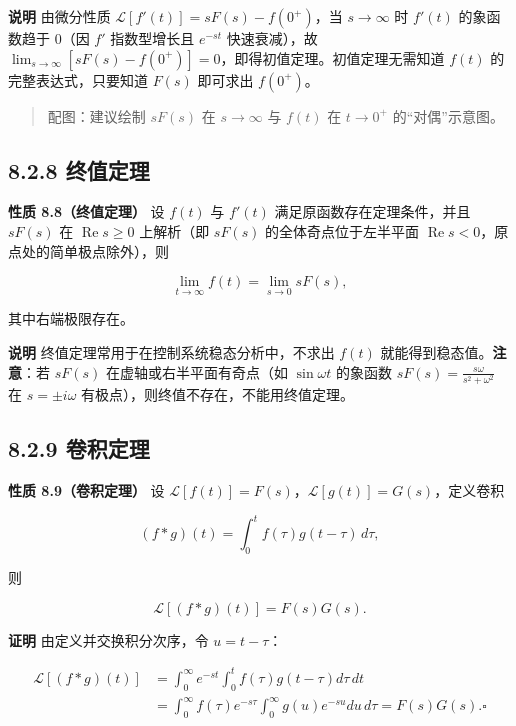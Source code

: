 \textbf{说明} 由微分性质 \(\mathcal{L}[f'(t)]=sF(s)-f(0^+)\)，当
\(s\to\infty\) 时 \(f'(t)\) 的象函数趋于 \(0\)（因 \(f'\) 指数型增长且
\(e^{-st}\) 快速衰减），故
\(\lim_{s\to\infty}[sF(s)-f(0^+)]=0\)，即得初值定理。初值定理无需知道
\(f(t)\) 的完整表达式，只要知道 \(F(s)\) 即可求出 \(f(0^+)\)。

\begin{quote}
配图：建议绘制 \(sF(s)\) 在 \(s\to\infty\) 与 \(f(t)\) 在 \(t\to 0^+\)
的``对偶''示意图。
\end{quote}

\subsection{8.2.8 终值定理}\label{ux7ec8ux503cux5b9aux7406}

\textbf{性质 8.8（终值定理）} 设 \(f(t)\) 与 \(f'(t)\)
满足原函数存在定理条件，并且 \(sF(s)\) 在 \(\operatorname{Re}s\ge 0\)
上解析（即 \(sF(s)\) 的全体奇点位于左半平面
\(\operatorname{Re}s<0\)，原点处的简单极点除外），则

\[
\lim_{t\to\infty}f(t)=\lim_{s\to 0}sF(s),
\]

其中右端极限存在。

\textbf{说明} 终值定理常用于在控制系统稳态分析中，不求出 \(f(t)\)
就能得到稳态值。\textbf{注意}：若 \(sF(s)\) 在虚轴或右半平面有奇点（如
\(\sin\omega t\) 的象函数 \(sF(s)=\frac{s\omega}{s^2+\omega^2}\) 在
\(s=\pm i\omega\) 有极点），则终值不存在，不能用终值定理。

\subsection{8.2.9 卷积定理}\label{ux5377ux79efux5b9aux7406-1}

\textbf{性质 8.9（卷积定理）} 设
\(\mathcal{L}[f(t)]=F(s)\)，\(\mathcal{L}[g(t)]=G(s)\)，定义卷积

\[
(f*g)(t)=\int_0^{t}f(\tau)g(t-\tau)\,d\tau,
\]

则

\[
\mathcal{L}[(f*g)(t)] = F(s)G(s).
\]

\textbf{证明} 由定义并交换积分次序，令 \(u=t-\tau\)：

\[
\begin{aligned}
\mathcal{L}[(f*g)(t)]
&=\int_0^{\infty}e^{-st}\int_0^{t}f(\tau)g(t-\tau)d\tau\,dt\\[2pt]
&=\int_0^{\infty}f(\tau)e^{-s\tau}\int_0^{\infty}g(u)e^{-su}du\,d\tau
= F(s)G(s). \square
\end{aligned}
\]


